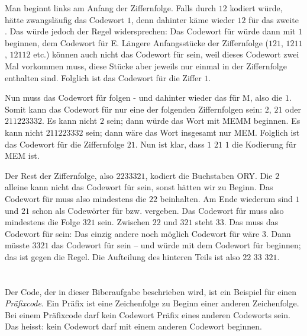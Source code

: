{{Man beginnt links am Anfang der Ziffernfolge. Falls  durch $12$ kodiert würde, hätte  zwangsläufig das Codewort $1$, denn dahinter käme wieder $12$ für das zweite . Das würde jedoch der Regel widersprechen: Das Codewort für  würde dann mit $1$ beginnen, dem Codewort für E. Längere Anfangsstücke der Ziffernfolge ($121$, $1211$, $12112$ etc.) können auch nicht das Codewort für  sein, weil dieses Codewort zwei Mal vorkommen muss, diese Stücke aber jeweils nur einmal in der Ziffernfolge enthalten sind. Folglich ist das Codewort für  die Ziffer $1$.

Nun muss das Codewort für  folgen - und dahinter wieder das für M, also die $1$.  Somit kann das Codewort für  nur eine der folgenden Ziffernfolgen sein: $2$, $21$ oder $211223332$. Es kann nicht $2$ sein; dann würde das Wort mit MEMM beginnen. Es kann nicht $211223332$ sein; dann wäre das Wort insgesamt nur MEM. Folglich ist das Codewort für  die Ziffernfolge $21$. Nun ist klar, dass $1$ $21$ $1$ die Kodierung für MEM ist.

Der Rest der Ziffernfolge, also $2233321$, kodiert die Buchstaben ORY. Die $2$ alleine kann nicht das Codewort für  sein, sonst hätten wir  zu Beginn. Das Codewort für  muss also mindestens die $22$ beinhalten. Am Ende wiederum sind $1$ und $21$ schon als Codewörter für  bzw.  vergeben. Das Codewort für  muss also mindestens die Folge $321$ sein. Zwischen $22$ und $321$ steht $33$. Das muss das Codewort für  sein: Das einzig andere noch möglich Codewort für  wäre $3$. Dann müsste $3321$ das Codewort für  sein – und würde mit dem Codewort für  beginnen; das ist gegen die Regel. Die Aufteilung des hinteren Teils ist also $22$ $33$ $321$.



\section*{\BrochureItsInformatics}
Der Code, der in dieser Biberaufgabe beschrieben wird, ist ein Beispiel für einen \emph{Präfixcode}. Ein Präfix ist eine Zeichenfolge zu Beginn einer anderen Zeichenfolge. Bei einem Präfixcode darf kein Codewort Präfix eines anderen Codeworts sein. Das heisst: kein Codewort darf mit einem anderen Codewort beginnen.

}}
